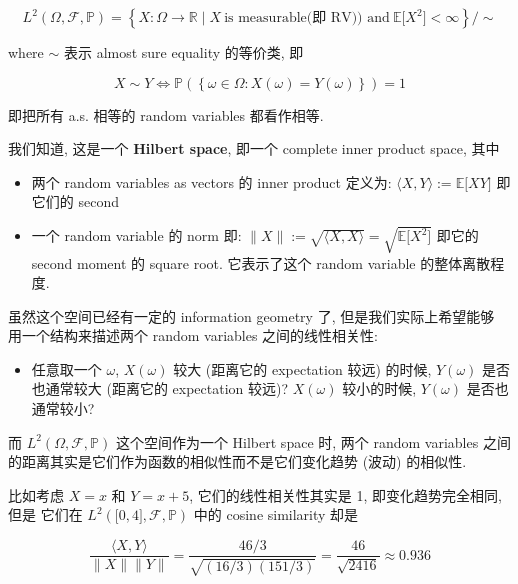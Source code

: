 \[\mathit{L}^{2}(\Omega,\mathcal{F},\mathbb{P}) = \left\{ {\mathit{X}:\Omega\rightarrow\mathbb{R} \mid \mathit{X}\ \text{is measurable(即 RV)) and}\ \mathbb{E}\lbrack\mathit{X}^{2}\rbrack < \infty} \right\}/ \sim\]

where \(\sim\) 表示 almost sure equality 的等价类, 即

\[\mathit{X} \sim \mathit{Y}\Leftrightarrow\mathbb{P}(\left\{ {\mathit{\omega} \in \Omega:\mathit{X}(\mathit{\omega}) = \mathit{Y}(\mathit{\omega})} \right\}) = 1\]

即把所有 a.s. 相等的 random variables 都看作相等.

我们知道, 这是一个 \textbf{Hilbert space}, 即一个 complete inner product space, 其中

\begin{itemize}
\item
  两个 random variables as vectors 的 inner product 定义为: \(\langle\mathit{X},\mathit{Y}\rangle := \mathbb{E}\lbrack\mathit{X}\mathit{Y}\rbrack\) 即它们的 second
\item
  一个 random variable 的 norm 即: \(\parallel \mathit{X} \parallel := \sqrt{\langle\mathit{X},\mathit{X}\rangle} = \sqrt{\mathbb{E}\lbrack\mathit{X}^{2}\rbrack}\) 即它的 second moment 的 square root. 它表示了这个 random variable 的整体离散程度.
\end{itemize}

虽然这个空间已经有一定的 information geometry 了, 但是我们实际上希望能够 用一个结构来描述两个 random variables 之间的线性相关性:

\begin{itemize}
\tightlist
\item
  任意取一个 \(\mathit{\omega}\), \(\mathit{X}(\mathit{\omega})\) 较大 (距离它的 expectation 较远) 的时候, \(\mathit{Y}(\mathit{\omega})\) 是否也通常较大 (距离它的 expectation 较远)? \(\mathit{X}(\mathit{\omega})\) 较小的时候, \(\mathit{Y}(\mathit{\omega})\) 是否也通常较小?
\end{itemize}

而 \(\mathit{L}^{2}(\Omega,\mathcal{F},\mathbb{P})\) 这个空间作为一个 Hilbert space 时, 两个 random variables 之间的距离其实是它们作为函数的相似性而不是它们变化趋势 (波动) 的相似性.

比如考虑 \(\mathit{X} = \mathit{x}\) 和 \(\mathit{Y} = \mathit{x} + 5\), 它们的线性相关性其实是 1, 即变化趋势完全相同, 但是 它们在 \(\mathit{L}^{2}(\lbrack 0,4\rbrack,\mathcal{F},\mathbb{P})\) 中的 cosine similarity 却是

\[\frac{\langle\mathit{X},\mathit{Y}\rangle}{\parallel \mathit{X} \parallel \parallel \mathit{Y} \parallel} = \frac{46/3}{\sqrt{(16/3)(151/3)}} = \frac{46}{\sqrt{2416}} \approx 0.936\]

